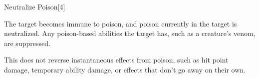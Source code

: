 \begin{spellsection}{Neutralize Poison}[4]
    \begin{spellheader}
    \end{spellheader}
    \begin{spellcontent}
        \begin{spelltargetinginfo}
        \end{spelltargetinginfo}
        \begin{spelleffects}
            \spelleffect The target becomes immune to poison, and poison currently in the target is neutralized. Any poison-based abilities the target has, such as a creature's venom, are suppressed.
            \spelldur \durext \dismissable
        \end{spelleffects}
    \end{spellcontent}
    \begin{spellfooter}
        \spellnotes This does not reverse instantaneous effects from poison, such as hit point damage, temporary ability damage, or effects that don't go away on their own.
    \end{spellfooter}
\end{spellsection}

